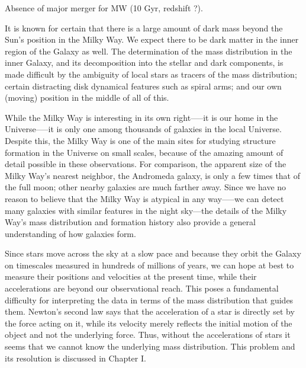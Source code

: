 Absence of major merger for MW (10 Gyr, redshift ?). 


It is known for certain that there is a large amount of dark mass
beyond the Sun’s position in the Milky Way. We expect there to be dark
matter in the inner region of the Galaxy as well. The determination of
the mass distribution in the inner Galaxy, and its decomposition into
the stellar and dark components, is made difficult by the ambiguity of
local stars as tracers of the mass distribution; certain distracting
disk dynamical features such as spiral arms; and our own (moving)
position in the middle of all of this.

While the Milky Way is interesting in its own right—--it is our home
in the Universe--—it is only one among thousands of galaxies in the
local Universe. Despite this, the Milky Way is one of the main sites
for studying structure formation in the Universe on small scales,
because of the amazing amount of detail possible in these
observations. For comparison, the apparent size of the Milky Way’s
nearest neighbor, the Andromeda galaxy, is only a few times that of
the full moon; other nearby galaxies are much farther away. Since we
have no reason to believe that the Milky Way is atypical in any
way—--we can detect many galaxies with similar features in the night
sky—the details of the Milky Way’s mass distribution and formation
history also provide a general understanding of how galaxies form.


Since stars move across the sky at a slow pace and because they orbit
the Galaxy on timescales measured in hundreds of millions of years, we
can hope at best to measure their positions and velocities at the
present time, while their accelerations are beyond our observational
reach. This poses a fundamental difficulty for interpreting the data
in terms of the mass distribution that guides them.  Newton’s second
law says that the acceleration of a star is directly set by the force
acting on it, while its velocity merely reflects the initial motion of
the object and not the underlying force. Thus, without the
accelerations of stars it seems that we cannot know the underlying
mass distribution. This problem and its resolution is discussed in
Chapter I.

